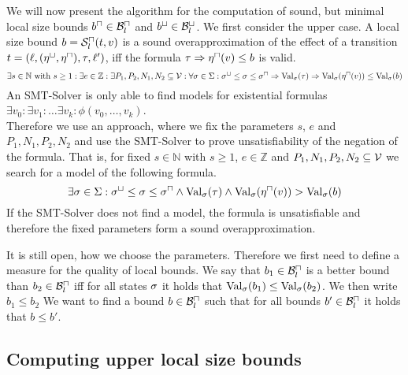 We will now present the algorithm for the computation of sound, but minimal local size bounds $b^\sqcap \in \mathcal{B}^\sqcap_l$ and $b^\sqcup \in \mathcal{B}^\sqcup_l$.
We first consider the upper case.
A local size bound $b = {\mathcal{S}^\sqcap_l}(t,v)$ is a sound overapproximation of the effect of a transition $t = (\ell,(\eta^\sqcup,\eta^\sqcap),\tau,\ell')$, iff the formula $\tau \Rightarrow \eta^\sqcap(v) \leq b$ is valid.
\[ \exists s \in \mathbb{N} \text{ with } s \geq 1:
\exists e \in \mathbb{Z}:
\exists P_1, P_2, N_1, N_2 \subseteq \mathcal{V}:
\forall \sigma \in \Sigma:
{\sigma^\sqcup} \leq \sigma \leq {\sigma^\sqcap} \Rightarrow
\text{Val}_{\sigma}(\tau) \Rightarrow \text{Val}_{\sigma}(\eta^\sqcap(v)) \leq \text{Val}_{\sigma}(b) \]
An SMT-Solver is only able to find models for existential formulas $\exists v_0: \exists v_1: \dots \exists v_k: \phi(v_0, \dots, v_k)$. \cite{smt} \\
Therefore we use an approach, where we fix the parameters $s$, $e$ and $P_1, N_1, P_2, N_2$ and use the SMT-Solver to prove unsatisfiability of the negation of the formula.
That is, for fixed $s \in \mathbb{N}$ with $s \geq 1$, $e \in \mathbb{Z}$ and $P_1, N_1, P_2, N_2 \subseteq \mathcal{V}$ we search for a model of the following formula.
\[ \exists \sigma \in \Sigma: {\sigma^\sqcup} \leq \sigma \leq {\sigma^\sqcap} \wedge \text{Val}_{\sigma}(\tau) \wedge \text{Val}_{\sigma}(\eta^\sqcap(v)) > \text{Val}_{\sigma}(b) \]
If the SMT-Solver does not find a model, the formula is unsatisfiable and therefore the fixed parameters form a sound overapproximation.

It is still open, how we choose the parameters.
Therefore we first need to define a measure for the quality of local bounds.
We say that $b_1 \in \mathcal{B}^\sqcap_l$ is a better bound than $b_2 \in \mathcal{B}^\sqcap_l$ iff for all states $\sigma$ it holds that $\text{Val}_{\sigma}(b_1) \leq \text{Val}_{\sigma}(b_2)$.
We then write $b_1 \leq b_2$
We want to find a bound $b \in \mathcal{B}^\sqcap_l$ such that for all bounds $b' \in \mathcal{B}^\sqcap_l$ it holds that $b \leq b'$.

\subsection{Computing upper local size bounds}

